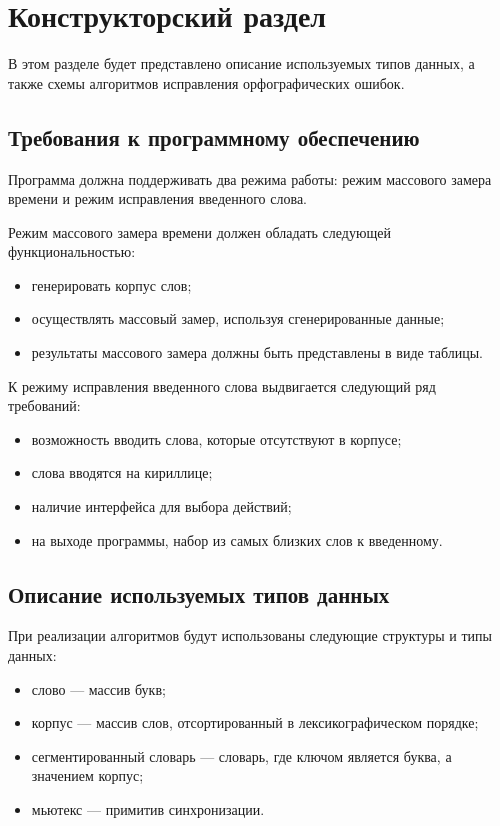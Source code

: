 \chapter{Конструкторский раздел}

В этом разделе будет представлено описание используемых типов данных, а также схемы алгоритмов исправления орфографических ошибок.

\section{Требования к программному обеспечению}

Программа должна поддерживать два режима работы: режим массового замера времени и режим исправления введенного слова.

Режим массового замера времени должен обладать следующей функциональностью:
\begin{itemize}
	\item генерировать корпус слов;
	\item осуществлять массовый замер, используя сгенерированные данные;
	\item результаты массового замера должны быть представлены в виде таблицы.
\end{itemize}

К режиму исправления введенного слова выдвигается следующий ряд требований:
\begin{itemize}
	\item возможность вводить слова, которые отсутствуют в корпусе;
	\item слова вводятся на кириллице;
	\item наличие интерфейса для выбора действий;
	\item на выходе программы, набор из самых близких слов к введенному.
\end{itemize}

\section{Описание используемых типов данных}

При реализации алгоритмов будут использованы следующие структуры
и типы данных:
\begin{itemize}
	\item слово --- массив букв;
	\item корпус --- массив слов, отсортированный в лексикографическом порядке;
	\item сегментированный словарь --- словарь, где ключом является буква, а значением корпус;
	\item мьютекс --- примитив синхронизации.
\end{itemize}


